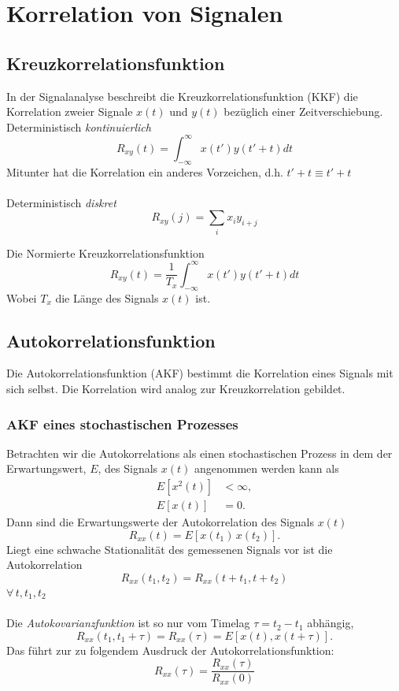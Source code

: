 \chapter{Korrelation von Signalen}

\section{Kreuzkorrelationsfunktion}

In der Signalanalyse beschreibt die Kreuzkorrelationsfunktion (KKF) die Korrelation zweier Signale $x(t)$ und $y(t)$ bezüglich einer Zeitverschiebung.\\

Deterministisch \textit{kontinuierlich}
\begin{equation}
R_{xy}(t) = \int_{-\infty}^{\infty} x(t') y(t'+t) dt
\end{equation}
{\small Mitunter hat die Korrelation ein anderes Vorzeichen, d.h. $t'+t \equiv t'+t$}\\\\

Deterministisch \textit{diskret}
\begin{equation}
R_{xy}(j) = \sum_i x_i y_{i+j}
\end{equation}

Die Normierte Kreuzkorrelationsfunktion
\begin{equation}
R_{xy}(t) = \frac{1}{T_x} \int_{-\infty}^{\infty} x(t') y(t'+t) dt
\end{equation}
{\small Wobei $T_x$ die Länge des Signals $x(t)$ ist.}


\section{Autokorrelationsfunktion}
Die Autokorrelationsfunktion (AKF) bestimmt die Korrelation eines Signals mit sich selbst. Die Korrelation wird analog zur Kreuzkorrelation gebildet.

\subsection{AKF eines stochastischen Prozesses}
Betrachten wir die Autokorrelations als einen stochastischen Prozess in dem der Erwartungswert, $E$, des Signals $x(t)$ angenommen werden kann als
\begin{align*}
E[x^2(t)] & < \infty,\\
E[x(t)] & = 0.
\end{align*}
Dann sind die Erwartungswerte der Autokorrelation des Signals $x(t)$
\[
R_{xx}(t) = E[x(t_1)\,x(t_2)].
\]
Liegt eine schwache Stationalität des gemessenen Signals vor ist die Autokorrelation
\[
R_{xx}(t_1, t_2) = R_{xx}(t+t_1, t+t_2)
\]
{\small $\forall\,t, t_1, t_2$}\\\\
Die \textit{Autokovarianzfunktion} ist so nur vom Timelag $\tau = t_2 - t_1$ abhängig,
\[
R_{xx}(t_1, t_1+\tau) = R_{xx}(\tau) = E[x(t), x(t+\tau)].
\]
Das führt zur zu folgendem Ausdruck der Autokorrelationsfunktion:
\begin{equation}
R_{xx}(\tau) = \frac{R_{xx}(\tau)}{R_{xx}(0)}
\end{equation}


